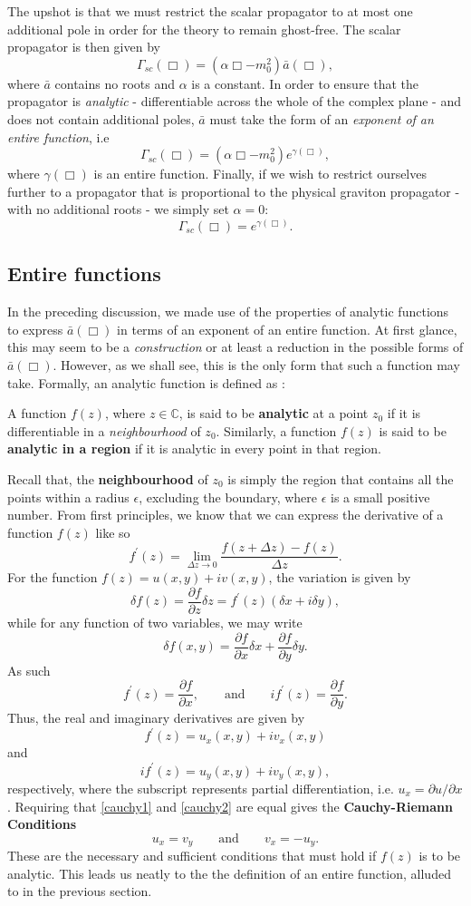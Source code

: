 The upshot is that we must restrict the scalar propagator to at most one additional pole in order for the theory to remain ghost-free. The scalar propagator is then given by
\[
\label{Gammastabar}
\Gamma_{sc}(\Box)=(\alpha\Box-m_0^2){\bar a}(\Box)
,\]
where ${\bar a}$ contains no roots and $\alpha$ is a constant. In order to ensure that the propagator is \emph{analytic} - differentiable across the whole of the complex plane - and does not contain additional poles, ${\bar a}$ must take the form of an \emph{exponent of an entire function}, i.e
\[
\Gamma_{sc}(\Box)=(\alpha\Box-m_0^2)e^{\gamma(\Box)}
,\]
where $\gamma(\Box)$ is an entire function. Finally, if we wish to restrict ourselves further to a propagator that is proportional to the physical graviton propagator - with no additional roots - we simply set $\alpha=0$:
\[
\Gamma_{sc}(\Box)=e^{\gamma(\Box)}
.\] 
\subsection{Entire functions}
In the preceding discussion, we made use of the properties of analytic functions to express ${\bar a}(\Box)$ in terms of an exponent of an entire function. At first glance, this may seem to be a \emph{construction} or at least a reduction in the possible forms of ${\bar a}(\Box)$. However, as we shall see, this is the only form that such a function may take. Formally, an analytic function is defined as \cite{Ablowitz:CV}:
\begin{definition}
A function $f(z)$, where $z\in {\mathbb C}$, is said to be \textbf{analytic} at a point $z_0$ if it is differentiable in a \emph{neighbourhood} of $z_0$. Similarly, a function $f(z)$ is said to be \textbf{analytic in a region} if it is analytic in every point in that region. 
\end{definition}
Recall that, the \textbf{neighbourhood} of $z_0$ is simply the region that contains all the points   within a radius $\epsilon$, excluding the boundary, where $\epsilon$ is a small positive number. From first principles, we know that we can express  the derivative of a function $f(z)$ like so
\[
f^{\prime}(z)=\lim_{\Delta z\rightarrow 0} \frac{f(z+\Delta z)-f(z)}{\Delta z}
.\]
For the function $f(z)=u(x,y)+i v(x,y)$, the variation is given by
\[
\delta f(z)=\frac{\partial f}{\partial z}\delta z=f^{\prime}(z)(\delta x +i \delta y)
,\]
while for any function of two variables, we may write
\[
\delta f(x,y) = \frac{\partial f}{\partial x}\delta x+\frac{\partial f}{\partial y}\delta y
.\]
As such
\[
f^{\prime}(z)=\frac{\partial f}{\partial x},\qquad\mbox{and}\qquad if^{\prime}(z)=\frac{\partial f}{\partial y}
.\]
Thus, the real and imaginary derivatives are given by
\[
\label{cauchy1}
f^\prime (z)=u_x (x,y)+i v_x(x,y)
\]
and
\[
\label{cauchy2}
i f^\prime (z)=u_y (x,y)+i v_y(x,y)
,\]
respectively, where the subscript represents partial differentiation, i.e. $u_x=\partial u /\partial x$. Requiring that \eqref{cauchy1} and \eqref{cauchy2} are equal gives the \textbf{Cauchy-Riemann Conditions}
\[
\label{cauchy3}
u_x=v_y\qquad \mbox{and}\qquad v_x=-u_y
.\]
These are the necessary and sufficient conditions that must hold if $f(z)$ is to be analytic. This leads us neatly to the the definition of an entire function, alluded to in the previous section.

